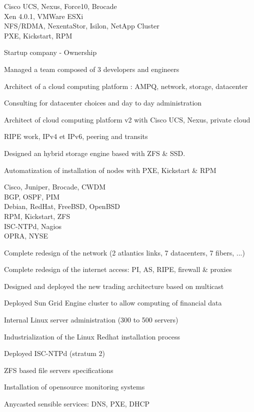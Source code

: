 \documentclass[a4paper,11pt]{cv4tw}%
\begin{document}
	{Cisco UCS, Nexus, Force10, Brocade\\Xen 4.0.1, VMWare ESXi\\NFS/RDMA, NexentaStor, Isilon, NetApp Cluster\\PXE, Kickstart, RPM}
		{ Startup company - Ownership
		\begin{missions}
			\item Managed a team composed of 3 developers and engineers
			\item Architect of a cloud computing platform : AMPQ, network, storage, datacenter
			\item Consulting for datacenter choices and day to day administration
			\item Architect of cloud computing platform v2 with Cisco UCS, Nexus, private cloud
			\item RIPE work, IPv4 et IPv6, peering and transits
			\item Designed an hybrid storage engine based with ZFS \& SSD.
			\item Automatization of installation of nodes with PXE, Kickstart \& RPM
		\end{missions}
	}


	{Cisco, Juniper, Brocade, CWDM\\BGP, OSPF, PIM\\Debian, RedHat, FreeBSD, OpenBSD\\RPM, Kickstart, ZFS\\ISC-NTPd, Nagios\\OPRA, NYSE}
		{
		\begin{missions}
			\item Complete redesign of the network (2 atlantics links, 7 datacenters, 7 fibers, ...)
			\item Complete redesign of the internet access: PI, AS, RIPE, firewall \& proxies
			\item Designed and deployed the new trading architecture based on multicast
			\item Deployed Sun Grid Engine cluster to allow computing of financial data 
			\item Internal Linux server administration (300 to 500 servers)
			\item Industrialization of the Linux Redhat installation process
			\item Deployed ISC-NTPd (stratum 2)
			\item ZFS based file servers specifications
			\item Installation of opensource monitoring systems 	
			\item Anycasted sensible services: DNS, PXE, DHCP
		\end{missions}
	}
\end{document}
